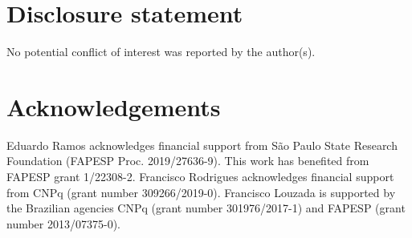 \documentclass[10pt,a4paper,onecolumn]{article} %
\begin{document}
\section*{Disclosure statement}

No potential conflict of interest was reported by the author(s).


\section*{Acknowledgements}

 Eduardo Ramos acknowledges financial support from S\~ao Paulo State Research Foundation (FAPESP Proc. 2019/27636-9). This work has benefited from FAPESP  grant 1/22308-2. Francisco Rodrigues acknowledges financial support from CNPq (grant number 309266/2019-0). Francisco Louzada is supported by the Brazilian agencies CNPq (grant number
301976/2017-1) and FAPESP (grant number 2013/07375-0).
\end{document}
